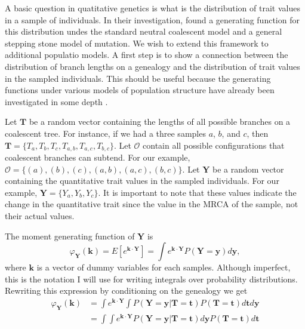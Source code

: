 A basic question in quatitative genetics is what is the distribution
of trait values in a sample of individuals. In their investigation,
\citet{Schraiber2015} found a generating function for this
distribution undes the standard neutral coalescent model and a general
stepping stone model of mutation. We wish to extend this framework to
additional populatio models. A first step is to show a connection
between the distribution of branch lengths on a genealogy and the
distribution of trait values in the sampled individuals. This should
be useful because the generating functions under various models of
population structure have already been investigated in some depth
\citep{Lohse2011}.

Let $\mathbf{T}$ be a random vector containing the lengths of all
possible branches on a coalescent tree. For instance, if we had a
three samples $a$, $b$, and $c$, then
$\mathbf{T}=\{T_a,T_b,T_c,T_{a,b},T_{a,c},T_{b,c}\}$. Let $\mathcal{O}$
contain all possible configurations that coalescent branches can
subtend. For our example, $\mathcal{O}=\{(a),(b),(c),(a,b),(a,c),(b,c)\}$.
Let $\mathbf{Y}$ be a random vector containing the quantitative trait
values in the sampled individuals. For our example,
$\mathbf{Y}=\{Y_a,Y_b,Y_c\}$. It is important to note that these values
indicate the change in the quantitative trait since the value in the
MRCA of the sample, not their actual values.

The moment generating function of $\mathbf{Y}$ is
\begin{equation}
  \varphi_{\mathbf{Y}}(\mathbf{k}) = E\left[ e^{\mathbf{k} \cdot \mathbf{Y}} \right] =
  \int e^{\mathbf{k} \cdot \mathbf{Y}} P(\mathbf{Y}=\mathbf{y}) d\mathbf{y},
\end{equation}
where $\mathbf{k}$ is a vector of dummy variables for each
samples. Although imperfect, this is the notation I will use for
writing integrals over probability distributions. Rewriting this
expression by conditioning on the genealogy we get
\begin{align}
  \varphi_{\mathbf{Y}}(\mathbf{k}) &= \int e^{\mathbf{k} \cdot \mathbf{Y}}
  \int P(\mathbf{Y}=\mathbf{y} | \mathbf{T}=\mathbf{t}) P(\mathbf{T}=\mathbf{t})
  d\mathbf{t} d\mathbf{y}\\
  &= \int \int e^{\mathbf{k} \cdot \mathbf{Y}} P(\mathbf{Y}=\mathbf{y} | \mathbf{T}=\mathbf{t}) d\mathbf{y}
  P(\mathbf{T}=\mathbf{t})
  d\mathbf{t}
\end{align}

